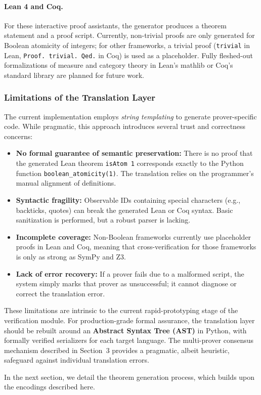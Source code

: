\paragraph{Lean 4 and Coq.} For these interactive proof assistants, the generator produces a theorem statement and a proof script. Currently, non-trivial proofs are only generated for Boolean atomicity of integers; for other frameworks, a trivial proof (\texttt{trivial} in Lean, \texttt{Proof. trivial. Qed.} in Coq) is used as a placeholder. Fully fleshed-out formalizations of measure and category theory in Lean's mathlib or Coq's standard library are planned for future work.

\subsubsection{Limitations of the Translation Layer}

The current implementation employs \textit{string templating} to generate prover-specific code. While pragmatic, this approach introduces several trust and correctness concerns:

\begin{itemize}
    \item \textbf{No formal guarantee of semantic preservation:} There is no proof that the generated Lean theorem \texttt{isAtom 1} corresponds exactly to the Python function \texttt{boolean\_atomicity(1)}. The translation relies on the programmer's manual alignment of definitions.
    \item \textbf{Syntactic fragility:} Observable IDs containing special characters (e.g., backticks, quotes) can break the generated Lean or Coq syntax. Basic sanitization is performed, but a robust parser is lacking.
    \item \textbf{Incomplete coverage:} Non-Boolean frameworks currently use placeholder proofs in Lean and Coq, meaning that cross-verification for those frameworks is only as strong as SymPy and Z3.
    \item \textbf{Lack of error recovery:} If a prover fails due to a malformed script, the system simply marks that prover as unsuccessful; it cannot diagnose or correct the translation error.
\end{itemize}

These limitations are intrinsic to the current rapid-prototyping stage of the \Apeiron{} verification module. For production-grade formal assurance, the translation layer should be rebuilt around an \textbf{Abstract Syntax Tree (AST)} in Python, with formally verified serializers for each target language. The multi-prover consensus mechanism described in Section~3 provides a pragmatic, albeit heuristic, safeguard against individual translation errors.

In the next section, we detail the theorem generation process, which builds upon the encodings described here.